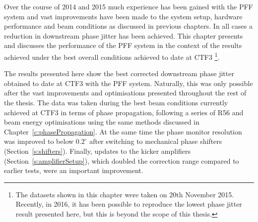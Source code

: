 
Over the course of 2014 and 2015 much experience has been gained with the PFF system and vast improvements have been made to the system setup, hardware performance and beam conditions as discussed in previous chapters. In all cases a reduction in downstream phase jitter has been achieved. This chapter presents and discusses the performance of the PFF system in the context of the results achieved under the best overall conditions achieved to date at CTF3 \footnote{The datasets shown in this chapter were taken on 20th November 2015. Recently, in 2016, it has been possible to reproduce the lowest phase jitter result presented here, but this is beyond the scope of this thesis.}.




The results presented here show the best corrected downstream phase jitter obtained to date at CTF3 with the PFF system. Naturally, this was only possible after the vast improvements and optimisations presented throughout the rest of the thesis. The data was taken during the best beam conditions currently achieved at CTF3 in terms of phase propagation, following a series of R56 and beam energy optimisations using the same methods discussed in Chapter~\ref{c:phasePropagation}. %
At the same time the phase monitor resolution was improved to below \(0.2^\circ\) after switching to mechanical phase shifters (Section~\ref{s:shifters}). Finally, updates to the kicker amplifiers (Section~\ref{s:amplifierSetup}), which doubled the correction range compared to earlier tests, were an important improvement.

